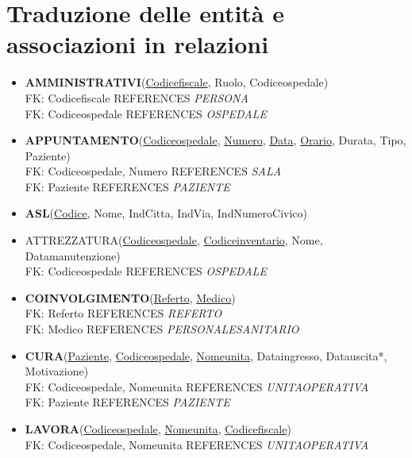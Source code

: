 \documentclass[a4paper,12pt]{report}
\begin{document}
\section{Traduzione delle entità e associazioni in relazioni}
\begin{itemize}
  \item \textbf{AMMINISTRATIVI}(\underline{Codice\textunderscore fiscale}, Ruolo, Codice\textunderscore ospedale) 
  \\ FK: Codice\textunderscore fiscale REFERENCES \emph{PERSONA}
  \\ FK: Codice\textunderscore ospedale REFERENCES \emph{OSPEDALE}
  \item \textbf{APPUNTAMENTO}(\underline{Codice\textunderscore ospedale}, \underline{Numero}, \underline{Data}, \underline{Orario}, Durata, Tipo, Paziente)
  \\ FK: Codice\textunderscore ospedale, Numero REFERENCES \emph{SALA}
  \\ FK: Paziente REFERENCES \emph{PAZIENTE}
  \item \textbf{ASL}(\underline{Codice}, Nome, Ind\textunderscore Citta, Ind\textunderscore Via, Ind\textunderscore Numero\textunderscore Civico)
  \item ATTREZZATURA(\underline{Codice\textunderscore ospedale}, \underline{Codice\textunderscore inventario}, Nome, Data\textunderscore manutenzione)
  \\ FK: Codice\textunderscore ospedale REFERENCES \emph{OSPEDALE}
  \item \textbf{COINVOLGIMENTO}(\underline{Referto}, \underline{Medico})
  \\ FK: Referto REFERENCES \emph{REFERTO}
  \\ FK: Medico REFERENCES \emph{PERSONALE\textunderscore SANITARIO}
  \item \textbf{CURA}(\underline{Paziente}, \underline{Codice\textunderscore ospedale}, \underline{Nome\textunderscore unita}, Data\textunderscore ingresso, Data\textunderscore uscita*, Motivazione)
  \\ FK: Codice\textunderscore ospedale, Nome\textunderscore unita REFERENCES \emph{UNITA\textunderscore OPERATIVA}
  \\ FK: Paziente REFERENCES \emph{PAZIENTE}
  \item \textbf{LAVORA}(\underline{Codice\textunderscore ospedale}, \underline{Nome\textunderscore unita}, \underline{Codice\textunderscore fiscale})
  \\ FK: Codice\textunderscore ospedale, Nome\textunderscore unita REFERENCES \emph{UNITA\textunderscore OPERATIVA}

\end{itemize}
\end{document}

